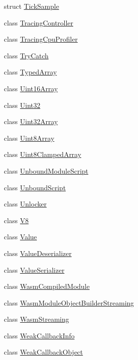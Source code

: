 \begin{DoxyCompactItemize}
struct \mbox{\hyperlink{structv8_1_1TickSample}{Tick\+Sample}}
\item 
class \mbox{\hyperlink{classv8_1_1TracingController}{Tracing\+Controller}}
\item 
class \mbox{\hyperlink{classv8_1_1TracingCpuProfiler}{Tracing\+Cpu\+Profiler}}
\item 
class \mbox{\hyperlink{classv8_1_1TryCatch}{Try\+Catch}}
\item 
class \mbox{\hyperlink{classv8_1_1TypedArray}{Typed\+Array}}
\item 
class \mbox{\hyperlink{classv8_1_1Uint16Array}{Uint16\+Array}}
\item 
class \mbox{\hyperlink{classv8_1_1Uint32}{Uint32}}
\item 
class \mbox{\hyperlink{classv8_1_1Uint32Array}{Uint32\+Array}}
\item 
class \mbox{\hyperlink{classv8_1_1Uint8Array}{Uint8\+Array}}
\item 
class \mbox{\hyperlink{classv8_1_1Uint8ClampedArray}{Uint8\+Clamped\+Array}}
\item 
class \mbox{\hyperlink{classv8_1_1UnboundModuleScript}{Unbound\+Module\+Script}}
\item 
class \mbox{\hyperlink{classv8_1_1UnboundScript}{Unbound\+Script}}
\item 
class \mbox{\hyperlink{classv8_1_1Unlocker}{Unlocker}}
\item 
class \mbox{\hyperlink{classv8_1_1V8}{V8}}
\item 
class \mbox{\hyperlink{classv8_1_1Value}{Value}}
\item 
class \mbox{\hyperlink{classv8_1_1ValueDeserializer}{Value\+Deserializer}}
\item 
class \mbox{\hyperlink{classv8_1_1ValueSerializer}{Value\+Serializer}}
\item 
class \mbox{\hyperlink{classv8_1_1WasmCompiledModule}{Wasm\+Compiled\+Module}}
\item 
class \mbox{\hyperlink{classv8_1_1WasmModuleObjectBuilderStreaming}{Wasm\+Module\+Object\+Builder\+Streaming}}
\item 
class \mbox{\hyperlink{classv8_1_1WasmStreaming}{Wasm\+Streaming}}
\item 
class \mbox{\hyperlink{classv8_1_1WeakCallbackInfo}{Weak\+Callback\+Info}}
\item 
class \mbox{\hyperlink{classv8_1_1WeakCallbackObject}{Weak\+Callback\+Object}}
\end{DoxyCompactItemize}
